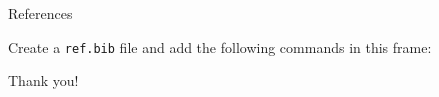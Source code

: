 \documentclass{beamer}
\begin{document}
\begin{frame}{References}

Create a \texttt{ref.bib} file and add the following commands in this frame: \\

\begin{semiverbatim}
  \\footnotesize\{
	  \\{apalike\}
	  \\{ref\}
  \}
\end{semiverbatim}


\end{frame}


{

\begin{frame}[plain]

\begin{center}
	\textcolor{mblue}{\Large{Thank you!}}
\end{center}


\end{frame}
}
\end{document}
